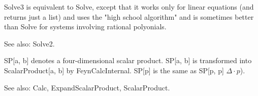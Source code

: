 







Solve3 is equivalent to Solve, except that it works only for linear equations (and returns just a list) and uses the "high school
  algorithm" and is sometimes better than Solve for systems involving rational polyonials.



See also: Solve2.






SP[a, b] denotes a four-dimensional scalar product. SP[a, b] is transformed into ScalarProduct[a, b] by FeynCalcInternal. SP[p] is the
  same as SP[p, p] \(\Delta \cdot p\)).

See also:  Calc, ExpandScalarProduct, ScalarProduct.







